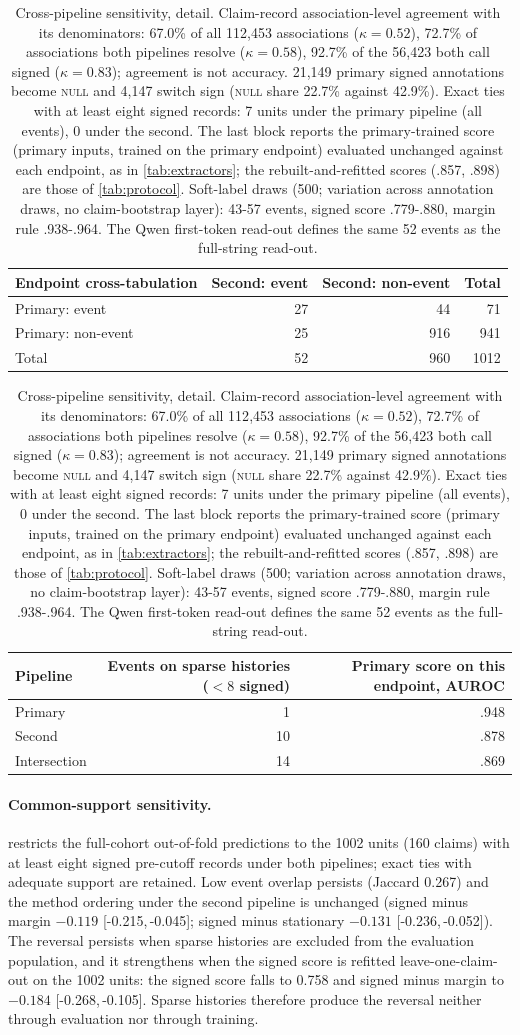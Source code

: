 \documentclass[11pt]{article}
\newcommand{\ci}[2]{[#1,\,#2]}
\begin{document}
\begin{table}[!t]
\begin{tabular}{@{}lrrr@{}}
\toprule
Endpoint cross-tabulation & Second: event & Second: non-event & Total \\
\midrule
Primary: event & 27 & 44 & 71 \\
Primary: non-event & 25 & 916 & 941 \\
Total & 52 & 960 & 1012 \\
\bottomrule
\end{tabular}
\hspace{4mm}
\begin{tabular}{@{}lrr@{}}
\toprule
Pipeline & Events on sparse histories ($<8$ signed) & Primary score on this endpoint, AUROC \\
\midrule
Primary & 1 & .948 \\
Second & 10 & .878 \\
Intersection & 14 & .869 \\
\bottomrule
\end{tabular}
\caption{Cross-pipeline sensitivity, detail. Claim-record association-level agreement with its denominators: 67.0\% of all 112{,}453 associations ($\kappa=0.52$), 72.7\% of associations both pipelines resolve ($\kappa=0.58$), 92.7\% of the 56{,}423 both call signed ($\kappa=0.83$); agreement is not accuracy. 21{,}149 primary signed annotations become \textsc{null} and 4{,}147 switch sign (\textsc{null} share 22.7\% against 42.9\%). Exact ties with at least eight signed records: 7 units under the primary pipeline (all events), 0 under the second. The last block reports the primary-trained score (primary inputs, trained on the primary endpoint) evaluated unchanged against each endpoint, as in \cref{tab:extractors}; the rebuilt-and-refitted scores (.857, .898) are those of \cref{tab:protocol}. Soft-label draws (500; variation across annotation draws, no claim-bootstrap layer): 43-57 events, signed score .779-.880, margin rule .938-.964. The Qwen first-token read-out defines the same 52 events as the full-string read-out.}
\label{tab:reextract}
\end{table}


\paragraph{Common-support sensitivity.}  restricts the full-cohort out-of-fold predictions to the 1002 units (160 claims) with at least eight signed pre-cutoff records under both pipelines; exact ties with adequate support are retained. Low event overlap persists (Jaccard 0.267) and the method ordering under the second pipeline is unchanged (signed minus margin $-0.119$ \ci{-0.215}{-0.045}; signed minus stationary $-0.131$ \ci{-0.236}{-0.052}). The reversal persists when sparse histories are excluded from the evaluation population, and it strengthens when the signed score is refitted leave-one-claim-out on the 1002 units: the signed score falls to 0.758 and signed minus margin to $-0.184$ \ci{-0.268}{-0.105}. Sparse histories therefore produce the reversal neither through evaluation nor through training.
\end{document}
